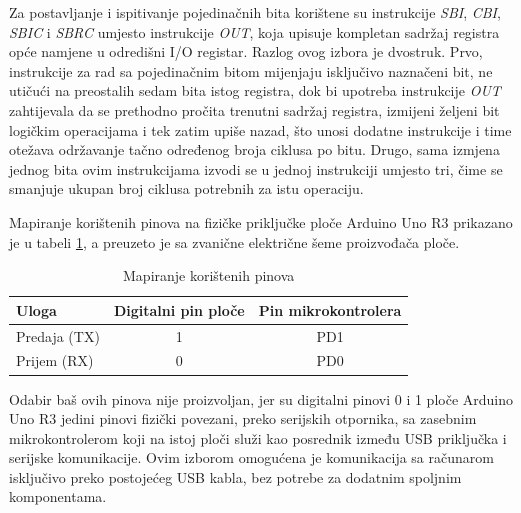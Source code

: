 Za postavljanje i ispitivanje pojedinačnih bita korištene su instrukcije
\emph{SBI}, \emph{CBI}, \emph{SBIC} i \emph{SBRC} umjesto instrukcije \emph{OUT}, koja upisuje
kompletan sadržaj registra opće namjene u odredišni I/O registar. Razlog
ovog izbora je dvostruk. Prvo, instrukcije za rad sa pojedinačnim bitom
mijenjaju isključivo naznačeni bit, ne utičući na preostalih sedam bita
istog registra, dok bi upotreba instrukcije \emph{OUT} zahtijevala da se
prethodno pročita trenutni sadržaj registra, izmijeni željeni bit
logičkim operacijama i tek zatim upiše nazad, što unosi dodatne
instrukcije i time otežava održavanje tačno određenog broja ciklusa po
bitu. Drugo, sama izmjena jednog bita ovim instrukcijama izvodi se u
jednoj instrukciji umjesto tri, čime se smanjuje ukupan broj ciklusa
potrebnih za istu operaciju.

Mapiranje korištenih pinova na fizičke priključke ploče Arduino Uno R3
prikazano je u tabeli \ref{tab:pinmap}, a preuzeto je sa zvanične
električne šeme proizvođača ploče.

\begin{table}[H]
\centering
\caption{Mapiranje korištenih pinova}
\label{tab:pinmap}
\begin{tabular}{|l|c|c|}
\hline
\textbf{Uloga} & \textbf{Digitalni pin ploče} & \textbf{Pin mikrokontrolera} \\
\hline
Predaja (TX) & 1 & PD1 \\
Prijem (RX)  & 0 & PD0 \\
\hline
\end{tabular}
\end{table}

Odabir baš ovih pinova nije proizvoljan, jer su digitalni pinovi 0 i 1
ploče Arduino Uno R3 jedini pinovi fizički povezani, preko serijskih
otpornika, sa zasebnim mikrokontrolerom koji na istoj ploči služi kao
posrednik između \foreignlanguage{english}{USB} priključka i serijske
komunikacije. Ovim izborom omogućena je komunikacija sa računarom
isključivo preko postojećeg \foreignlanguage{english}{USB} kabla, bez
potrebe za dodatnim spoljnim komponentama.
%
